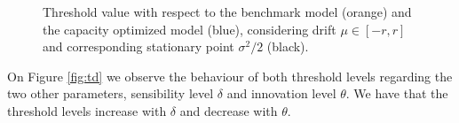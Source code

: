 \begin{figure}[!htb]
	\begin{subfigmatrix}{2}
	\end{subfigmatrix}
	\caption{Threshold value with respect to the benchmark model (orange) and the capacity optimized model (blue), considering drift $\mu \in [-r, r]$ and corresponding stationary point $\sigma^2/2$ (black).}
	\label{fig:mu}
\end{figure}

On Figure \ref{fig:td} we observe the behaviour of both threshold levels regarding the two other parameters, sensibility level $\delta$ and innovation level $\theta$. We have that the threshold levels increase with $\delta$ and decrease with $\theta$.

